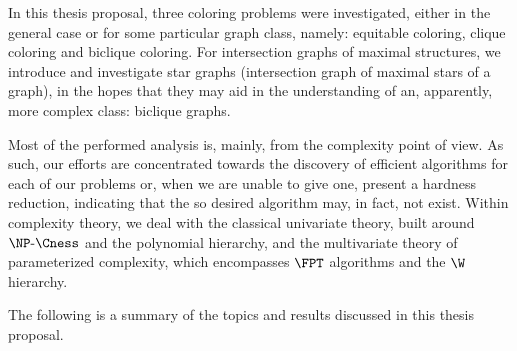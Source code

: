 In this thesis proposal, three coloring problems were investigated, either in the general case or for some particular graph class, namely: equitable coloring, clique coloring and biclique coloring.
For intersection graphs of maximal structures, we introduce and investigate star graphs (intersection graph of maximal stars of a graph), in the hopes that they may aid in the understanding of an, apparently, more complex class: biclique graphs.

Most of the performed analysis is, mainly, from the complexity point of view.
As such, our efforts are concentrated towards the discovery of efficient algorithms for each of our problems or, when we are unable to give one, present a hardness reduction, indicating that the so desired algorithm may, in fact, not exist.
Within complexity theory, we deal with the classical univariate theory, built around $\NPcness$ and the polynomial hierarchy, and the multivariate theory of parameterized complexity, which encompasses $\FPT$ algorithms and the $\W$ hierarchy.

The following is a summary of the topics and results discussed in this thesis proposal.

